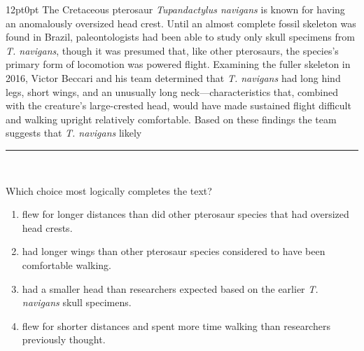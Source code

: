 \documentclass[11pt, twocolumn]{article}
\newcounter{questionnum}
\begin{document}
\vspace{6pt}\noindent
\begin{minipage}{\columnwidth}\raggedright
\noindent{}\par\vspace{8pt}
\begin{adjustwidth}{12pt}{0pt}
The Cretaceous pterosaur \textit{Tupandactylus navigans }is known for having an anomalously oversized head crest. Until an almost complete fossil skeleton was found in Brazil, paleontologists had been able to study only skull specimens from \textit{T. navigans}, though it was presumed that, like other pterosaurs, the species's primary form of locomotion was powered flight. Examining the fuller skeleton in 2016, Victor Beccari and his team determined that \textit{T. navigans }had long hind legs, short wings, and an unusually long neck---characteristics that, combined with the creature's large-crested head, would have made sustained flight difficult and walking upright relatively comfortable. Based on these findings the team suggests that \textit{T. navigans }likely \,\rule{2cm}{0.4pt}\,
\vspace{6pt}

Which choice most logically completes the text?
\begin{enumerate}[label=\Alph*),leftmargin=18pt,topsep=3pt,itemsep=2pt]
  \item flew for longer distances than did other pterosaur species that had oversized head crests.
  \item had longer wings than other pterosaur species considered to have been comfortable walking.
  \item had a smaller head than researchers expected based on the earlier \textit{T. navigans} skull specimens.
  \item flew for shorter distances and spent more time walking than researchers previously thought.
\end{enumerate}
\end{adjustwidth}
\end{minipage}\par
\end{document}

